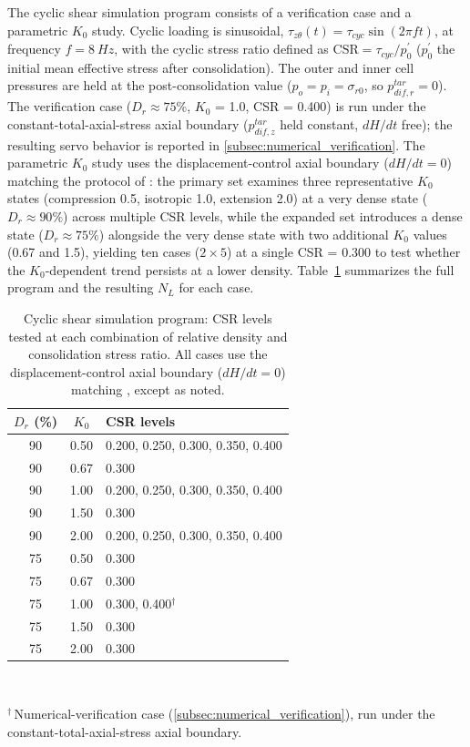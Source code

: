 \documentclass[a4paper,fleqn]{cas-sc}
\newcommand{\Kzero}{\ensuremath{K_0}}
\begin{document}
The cyclic shear simulation program consists of a verification case and a parametric \Kzero{} study. Cyclic loading is sinusoidal, $\tau_{z\theta}(t) = \tau_{cyc}\sin(2\pi f t)$, at frequency $f = \SI{8}{Hz}$, with the cyclic stress ratio defined as $\mathrm{CSR} = \tau_{cyc}/p_0^{\prime}$ ($p_0^{\prime}$ the initial mean effective stress after consolidation). The outer and inner cell pressures are held at the post-consolidation value ($p_o=p_i=\sigma_{r0}$, so $p_{dif,r}^{tar}=0$). The verification case ($D_r \approx 75\%$, \Kzero{} = 1.0, CSR = 0.400) is run under the constant-total-axial-stress axial boundary ($p_{dif,z}^{tar}$ held constant, $dH/dt$ free); the resulting servo behavior is reported in \cref{subsec:numerical_verification}. The parametric \Kzero{} study uses the displacement-control axial boundary ($dH/dt=0$) matching the protocol of \citet{Ishihara1985}: the primary set examines three representative \Kzero{} states (compression 0.5, isotropic 1.0, extension 2.0) at a very dense state ($D_r \approx 90\%$) across multiple CSR levels, while the expanded set introduces a dense state ($D_r \approx 75\%$) alongside the very dense state with two additional \Kzero{} values (0.67 and 1.5), yielding ten cases ($2 \times 5$) at a single CSR = 0.300 to test whether the \Kzero{}-dependent trend persists at a lower density. Table~\ref{tab:case_matrix} summarizes the full program and the resulting $N_L$ for each case.

\begin{table}[t]
  \centering
  \caption{Cyclic shear simulation program: CSR levels tested at each combination of relative density and consolidation stress ratio. All cases use the displacement-control axial boundary ($dH/dt=0$) matching \citet{Ishihara1985}, except as noted.}
  \label{tab:case_matrix}
  \begin{tabular}{@{}ccl@{}}
    \toprule
    $D_r$ (\%) & $\Kzero$ & CSR levels \\
    \midrule
    90 & 0.50 & 0.200, 0.250, 0.300, 0.350, 0.400 \\
    90 & 0.67 & 0.300 \\
    90 & 1.00 & 0.200, 0.250, 0.300, 0.350, 0.400 \\
    90 & 1.50 & 0.300 \\
    90 & 2.00 & 0.200, 0.250, 0.300, 0.350, 0.400 \\
    \midrule
    75 & 0.50 & 0.300 \\
    75 & 0.67 & 0.300 \\
    75 & 1.00 & 0.300, 0.400$^{\dagger}$ \\
    75 & 1.50 & 0.300 \\
    75 & 2.00 & 0.300 \\
    \bottomrule
  \end{tabular}\\[2pt]
  \begin{minipage}{0.95\linewidth}
    \footnotesize $^{\dagger}$\,Numerical-verification case (\cref{subsec:numerical_verification}), run under the constant-total-axial-stress axial boundary.
  \end{minipage}
\end{table}
\end{document}
